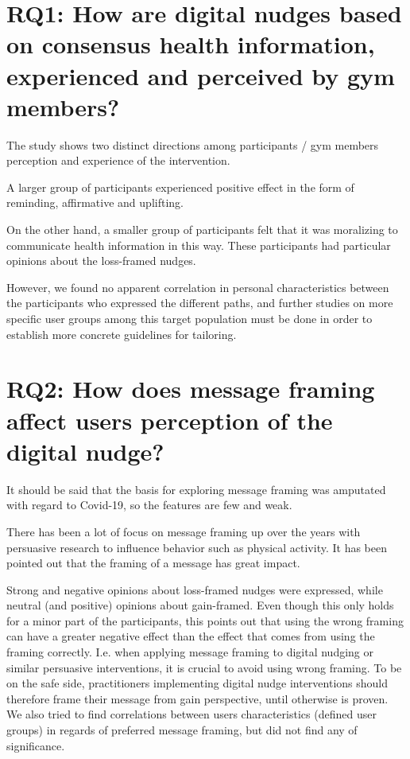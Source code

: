\section{RQ1: How are digital nudges based on consensus health information, experienced and perceived by gym members?}

The study shows two distinct directions among participants / gym members perception and experience of the intervention. 

A larger group of participants experienced positive effect in the form of reminding, affirmative and uplifting. 


On the other hand, a smaller group of participants felt that it was moralizing to communicate health information in this way. These participants had particular opinions about the loss-framed nudges. 

However, we found no apparent correlation in personal characteristics between the participants who expressed the different paths, and further studies on more specific user groups among this target population must be done in order to establish more concrete guidelines for tailoring. 

\section{RQ2: How does message framing affect users perception of the digital nudge?}

It should be said that the basis for exploring message framing was amputated with regard to Covid-19, so the features are few and weak.

There has been a lot of focus on message framing up over the years with persuasive research to influence behavior such as physical activity. It has been pointed out that the framing of a message has great impact.  

Strong and negative opinions about loss-framed nudges were expressed, while neutral (and positive) opinions about gain-framed. Even though this only holds for a minor part of the participants, this points out that using the wrong framing can have a greater negative effect than the effect that comes from using the framing correctly. I.e. when applying message framing to digital nudging or similar persuasive interventions, it is crucial to avoid using wrong framing. To be on the safe side, practitioners implementing digital nudge interventions should therefore frame their message from gain perspective, until otherwise is proven.  We also tried to find correlations between users characteristics (defined user groups) in regards of preferred message framing, but did not find any of significance. 

